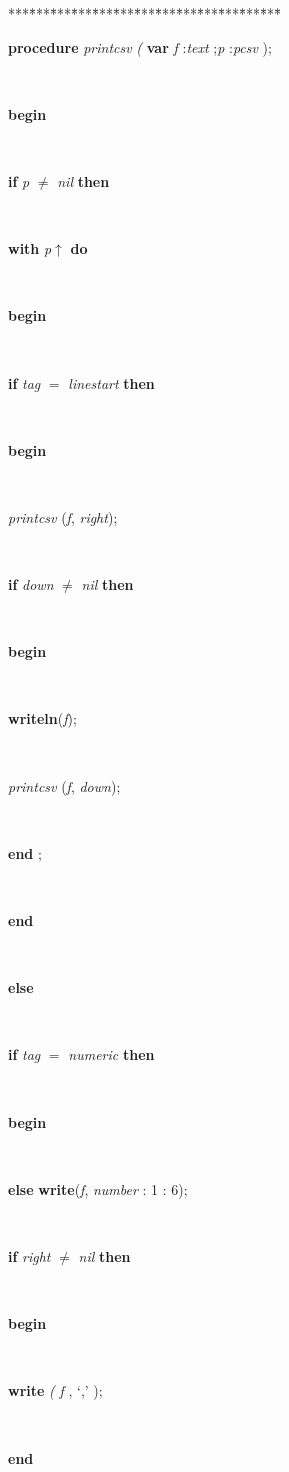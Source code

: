 \begin{tabbing}
***\=***\=***\=***\=***\=***\=***\=***\=***\=***\=***\=***\=***\=\kill
\parbox{14cm}{\textsf{\textbf{procedure}  \textit{printcsv} \textit{(} \textbf{var}  \textit{f} :\textit{text} ;\textit{p} :\textit{pcsv} );}}\\
\+\parbox{14cm}{\textsf{\textbf{begin} }}\\
\+\parbox{14cm}{\textsf {\textbf {if } \textsf{\textit{p} $\neq$ \textit{nil}} \textbf{ then } }}\\
\+\parbox{14cm}{\textsf {\textbf {with } \textsf{\textit{p}$\uparrow$\textit{}} \textbf{ do } }}\\
\<\parbox{14cm}{\textsf{\textbf{begin} }}\\
\+\parbox{14cm}{\textsf {\textbf {if } \textsf{\textit{tag} $=$ \textit{linestart}} \textbf{ then } }}\\
\<\parbox{14cm}{\textsf{\textbf{begin} }}\\
\parbox{14cm}{\textsf{\textit{printcsv} (\textit{f}, \textit{right})}; }\\
\+\parbox{14cm}{\textsf {\textbf {if } \textsf{\textit{down} $\neq$ \textit{nil}} \textbf{ then } }}\\
\<\parbox{14cm}{\textsf{\textbf{begin} }}\\
\parbox{14cm}{\textsf{\textbf{writeln}(\textit{f})}; }\\
\parbox{14cm}{\textsf{\textit{printcsv} (\textit{f}, \textit{down})}; }\\
\<\-\parbox{14cm}{\textsf{\textbf{end} ;}}\\
\<\-\parbox{14cm}{\textsf{\textbf{end} }}\\
\+\parbox{14cm}{\textsf{\textbf{else} }}\\
\+\parbox{14cm}{\textsf {\textbf {if } \textsf{\textit{tag} $=$ \textit{numeric}} \textbf{ then } }}\\
\<\parbox{14cm}{\textsf{\textbf{begin} }}\\
\parbox{14cm}{\textsf {\textbf {else } \textsf{\textbf{write}(\textit{f}, \textit{number} : 1 : 6)}; }}\\
\+\parbox{14cm}{\textsf {\textbf {if } \textsf{\textit{right} $\neq$ \textit{nil}} \textbf{ then } }}\\
\<\parbox{14cm}{\textsf{\textbf{begin} }}\\
\parbox{14cm}{\textsf{\textbf{write} \textit{(} \textit{f} ,\textrm{\textup { `,' } });}}\\
\<\-\parbox{14cm}{\textsf{\textbf{end} }}\\

\end{tabbing}
